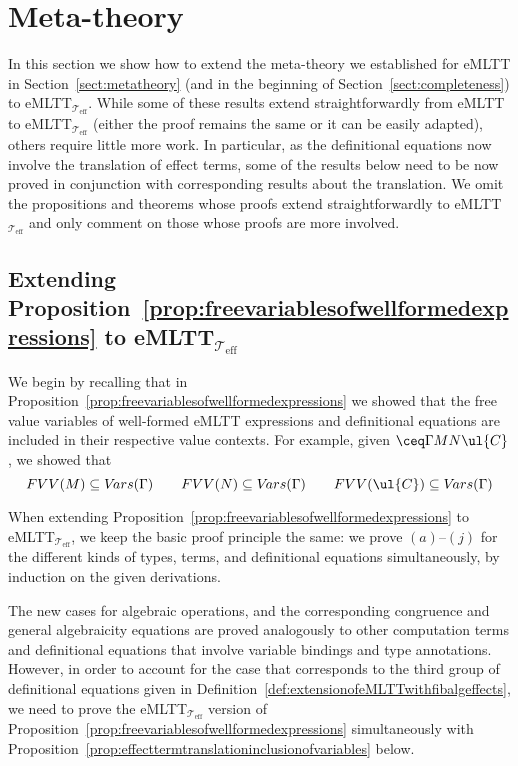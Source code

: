 \section{Meta-theory} 
\label{sect:emlttalgeffectsmetatheory}

In this section we show how to extend the meta-theory we established for eMLTT in Section~\ref{sect:metatheory} (and in the beginning of Section~\ref{sect:completeness}) to eMLTT$_{\mathcal{T}_{\text{eff}}}$. While some of these results extend straightforwardly from eMLTT to eMLTT$_{\mathcal{T}_{\text{eff}}}$ (either the proof remains the same or it can be easily adapted), others require little more work. In particular, as the definitional equations now involve the translation of effect terms, some of the results below need to be now proved in conjunction with corresponding results about the translation. We omit the propositions and theorems whose proofs extend straightforwardly to eMLTT$_{\mathcal{T}_{\text{eff}}}$ and only comment on those whose proofs are more involved.

\subsection*{Extending Proposition~\ref{prop:freevariablesofwellformedexpressions} to eMLTT$_{\!\mathcal{T}_{\text{eff}}}$}

We begin by recalling that in Proposition~\ref{prop:freevariablesofwellformedexpressions} we showed that the free value variables of well-formed eMLTT expressions and definitional equations are included in their respective value contexts. For example, given $\ceq \Gamma M N \ul{C}$, we showed that
\[
FVV(M) \subseteq V\!ars(\Gamma)
\qquad
FVV(N) \subseteq V\!ars(\Gamma)
\qquad
FVV(\ul{C}) \subseteq V\!ars(\Gamma)
\]

When extending Proposition~\ref{prop:freevariablesofwellformedexpressions} to eMLTT$_{\mathcal{T}_{\text{eff}}}$, we keep the basic proof principle the same: we prove $(a)$--$(j)$ for the different kinds of types, terms, and definitional equations simultaneously, by induction on the given derivations. 

The new cases for algebraic operations, and the corresponding congruence and general algebraicity equations are proved analogously to other computation terms and definitional equations that involve variable bindings and type annotations. However, in order to account for the case that corresponds to the third group of definitional equations given in Definition~\ref{def:extensionofeMLTTwithfibalgeffects}, we need to prove the eMLTT$_{\mathcal{T}_{\text{eff}}}$ version of Proposition~\ref{prop:freevariablesofwellformedexpressions} simultaneously with Proposition~\ref{prop:effecttermtranslationinclusionofvariables} below.

